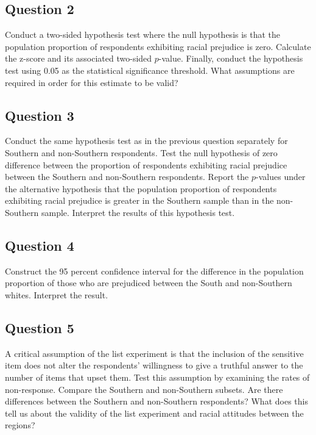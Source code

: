 \documentclass[]{article}
\begin{document}
\subsection{Question 2}\label{question-2}

Conduct a two-sided hypothesis test where the null hypothesis is that
the population proportion of respondents exhibiting racial prejudice is
zero. Calculate the z-score and its associated two-sided $p$-value.
Finally, conduct the hypothesis test using 0.05 as the statistical
significance threshold. What assumptions are required in order for this
estimate to be valid?

\subsection{Question 3}\label{question-3}

Conduct the same hypothesis test as in the previous question separately
for Southern and non-Southern respondents. Test the null hypothesis of
zero difference between the proportion of respondents exhibiting racial
prejudice between the Southern and non-Southern respondents. Report the
$p$-values under the alternative hypothesis that the population
proportion of respondents exhibiting racial prejudice is greater in the
Southern sample than in the non-Southern sample. Interpret the results
of this hypothesis test.

\subsection{Question 4}\label{question-4}

Construct the 95 percent confidence interval for the difference in the
population proportion of those who are prejudiced between the South and
non-Southern whites. Interpret the result.

\subsection{Question 5}\label{question-5}

A critical assumption of the list experiment is that the inclusion of
the sensitive item does not alter the respondents' willingness to give a
truthful answer to the number of items that upset them. Test this
assumption by examining the rates of non-response. Compare the Southern
and non-Southern subsets. Are there differences between the Southern and
non-Southern respondents? What does this tell us about the validity of
the list experiment and racial attitudes between the regions?
\end{document}
